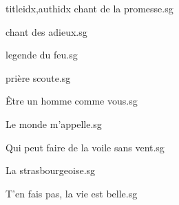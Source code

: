 \documentclass[
    ]{article}
\begin{document}
\begin{songs}{titleidx,authidx}
{chant de la promesse.sg}


{chant des adieux.sg}


{legende du feu.sg}


{prière scoute.sg}


{Être un homme comme vous.sg}


{Le monde m'appelle.sg}


{Qui peut faire de la voile sans vent.sg}


{La strasbourgeoise.sg}


{T'en fais pas, la vie est belle.sg}



\end{songs}
\end{document}

